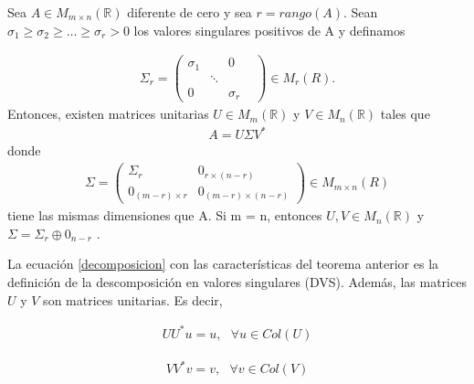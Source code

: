 \begin{theorem}
Sea $A \in M_{m \times n} (\mathbb{R})$ diferente de cero y sea $r =   rango(A)$. Sean $\sigma_1 \geq \sigma_2 \geq \dots \geq \sigma_r > 0$ los valores singulares positivos de A y definamos

\begin{equation*}
    \begin{aligned}
    \Sigma_r = 
    \begin{pmatrix}
    \sigma_1 & & 0 \\
     & \ddots & & \\
     0 & & \sigma_r
    \end{pmatrix}
    \in M_{r}(R).
    \end{aligned}
\end{equation*}
Entonces, existen matrices unitarias $U \in M_{m}(\mathbb{R})$ y $V \in M_{n}(\mathbb{R})$ tales que 
\begin{equation} \label{decomposicion}
    \begin{aligned}
    A = U \Sigma V^{*}
    \end{aligned}
\end{equation}
donde
\begin{equation*}
    \begin{aligned}
    \Sigma = 
    \begin{pmatrix}
    \Sigma_r & 0_{r \times (n-r)} \\
    0_{(m-r) \times r} & 0_{(m-r) \times (n-r)}
    \end{pmatrix}
    \in M_{m \times n}(R)
    \end{aligned}
\end{equation*}
 tiene las mismas dimensiones que A. Si m = n, entonces $U, V \in M_{n}(\mathbb{R})$ y $\Sigma = \Sigma_r \oplus 0_{n-r}$
 \cite[p.~421]{garcia2017second}.
\end{theorem}

La ecuación \ref{decomposicion} con las características del teorema anterior es la definición de la descomposición en valores singulares (DVS). Además, las matrices $U$ y $V$ son matrices unitarias. Es decir, 

\begin{equation*}
    \begin{aligned}
    U U^{*} u = u, \text{ } \forall u \in Col (U)
    \end{aligned}
\end{equation*}

\begin{equation*}
    \begin{aligned}
    V V^{*} v = v, \text{ } \forall v \in Col (V)
    \end{aligned}
\end{equation*}


